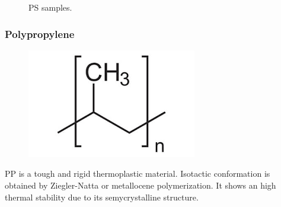 \documentclass[a4paper, 11pt]{article}
\begin{document}
\begin{figure}[htp]
	\centering
	\qquad
	\captionsetup{justification=centering}
	\caption{PS samples.}
	\label{fig:PS}
\end{figure} 

\subsubsection{Polypropylene}

\begin{figure}[htp]
	\centering
	{\includegraphics[scale=0.17]{pp_chem}}
	\captionsetup{justification=centering}
	\label{fig:PE}
\end{figure}
PP is a tough and rigid thermoplastic material. Isotactic conformation is obtained by Ziegler-Natta or metallocene polymerization. It shows an high thermal stability due to its semycrystalline structure.
\end{document}
